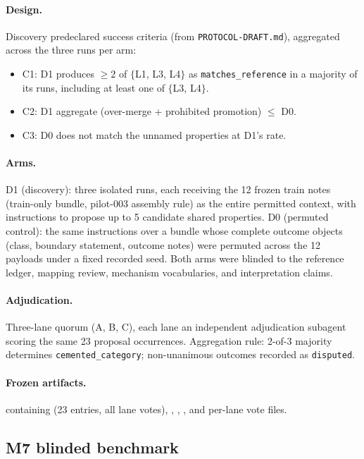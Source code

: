 \documentclass[11pt]{article}
\theoremstyle{gowthm}
\theoremstyle{gowplain}
\begin{document}
\paragraph{Design.} Discovery predeclared success criteria (from
\texttt{PROTOCOL-DRAFT.md}), aggregated across the three runs per arm:
\begin{itemize}[nosep]
  \item C1: D1 produces $\geq 2$ of $\{$L1, L3, L4$\}$ as
    \texttt{matches\_reference} in a majority of its runs, including at least
    one of $\{$L3, L4$\}$.
  \item C2: D1 aggregate (over-merge + prohibited promotion) $\leq$ D0.
  \item C3: D0 does not match the unnamed properties at D1's rate.
\end{itemize}

\paragraph{Arms.} D1 (discovery): three isolated runs, each receiving the 12
frozen train notes (train-only bundle, pilot-003 assembly rule) as the entire
permitted context, with instructions to propose up to 5 candidate shared
properties. D0 (permuted control): the same instructions over a bundle whose
complete outcome objects (class, boundary statement, outcome notes) were
permuted across the 12 payloads under a fixed recorded seed. Both arms were
blinded to the reference ledger, mapping review, mechanism vocabularies, and
interpretation claims.

\paragraph{Adjudication.} Three-lane quorum (A, B, C), each lane an
independent adjudication subagent scoring the same 23 proposal occurrences.
Aggregation rule: 2-of-3 majority determines \texttt{cemented\_category};
non-unanimous outcomes recorded as \texttt{disputed}.

\paragraph{Frozen artifacts.}
 containing
 (23 entries, all lane votes),
,
, ,
and per-lane vote files.

\subsection{M7 blinded benchmark}
\label{app:m7}
\end{document}
